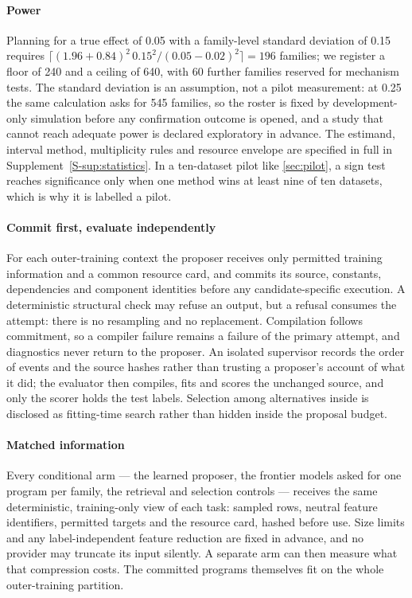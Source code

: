 \paragraph{Power} Planning for a true effect of 0.05 with a family-level standard deviation of 0.15
requires $\lceil (1.96+0.84)^2\, 0.15^2/(0.05-0.02)^2\rceil = 196$ families; we register a floor of
240 and a ceiling of 640, with 60 further families reserved for mechanism tests. The standard
deviation is an assumption, not a pilot measurement: at 0.25 the same calculation asks for 545
families, so the roster is fixed by development-only simulation before any confirmation outcome is
opened, and a study that cannot reach adequate power is declared exploratory in advance. The
estimand, interval method, multiplicity rules and resource envelope are specified in full in
Supplement~\ref{S-sup:statistics}. In a ten-dataset
pilot like \cref{sec:pilot}, a sign test reaches significance only when one method wins at least
nine of ten datasets, which is why it is labelled a pilot.

\paragraph{Commit first, evaluate independently} For each outer-training context the proposer
receives only permitted training information and a common resource card, and commits its source,
constants, dependencies and component identities before any candidate-specific execution. A
deterministic structural check may refuse an output, but a refusal consumes the attempt: there is no
resampling and no replacement. Compilation follows commitment, so a compiler failure remains a
failure of the primary attempt, and diagnostics never return to the proposer. An isolated supervisor
records the order of events and the source hashes rather than trusting a proposer's account of what
it did; the evaluator then compiles, fits and scores the unchanged source, and only the scorer holds
the test labels. Selection among alternatives inside  is disclosed as fitting-time search
rather than hidden inside the proposal budget.

\paragraph{Matched information} Every conditional arm --- the learned proposer, the frontier models
asked for one program per family, the retrieval and selection controls --- receives the same
deterministic, training-only view of each task: sampled rows, neutral feature identifiers, permitted
targets and the resource card, hashed before use. Size limits and any label-independent feature
reduction are fixed in advance, and no provider may truncate its input silently. A separate arm can
then measure what that compression costs. The committed programs themselves fit on the whole
outer-training partition.

